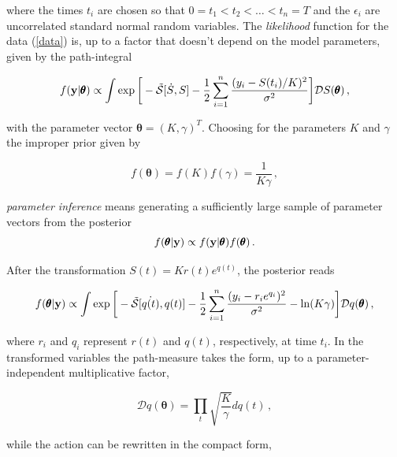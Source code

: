 \documentclass[11pt, a4paper]{article}
\newcommand{\vc}[1]{{\bf #1 }}
\newcommand{\bt}{\pmb\theta}
\begin{document}
where the times $t_i$ are chosen so that $0=t_1<t_2<\dots < t_n=T$ and the $\epsilon_i$ are uncorrelated standard normal random variables.
The {\em likelihood} function for the data (\ref{data}) is, up to a factor that doesn't depend on the model parameters, given by the path-integral

\begin{equation}\label{likelihood}
  f(\vc y | \bt)
  \propto
  \int
  \exp\bigg[
    -{\tilde{\mathcal S}}[\dot{S},S]
    -\frac{1}{2}
    \sum_{i=1}^n
    \frac
    {(y_i-S(t_i)/K)^2}
    {\sigma^2}
  \bigg]
  {\mathcal D} S(\bt)\,,
\end{equation}

with the parameter vector $\bt=(K,\gamma)^T$. Choosing for the parameters $K$ and $\gamma$ the improper prior given by

\begin{equation}\label{prior}
  f(\bt)
  =  f(K) f(\gamma) = \frac{1}{K \gamma} \,,
\end{equation}

{\em parameter inference} means generating a sufficiently large sample of parameter vectors from the posterior
\begin{equation}\label{posterior}
  f(\bt|\vc y)\propto f(\vc y|\bt)f(\bt)\,.
\end{equation}

After the transformation $S(t) = K r(t) e^{q(t)}$, the posterior reads

\begin{equation}\label{posterior_pathint}
  f(\bt | \vc y)
  \propto
  \int
  \exp\bigg[
    -{\tilde{\mathcal S}}[\dot{q(t)},q(t)]
    -\frac{1}{2}
    \sum_{i=1}^n
    \frac
    {(y_i-r_ie^{q_i})^2}
    {\sigma^2}
    -\ln(K\gamma)
  \bigg]
  {\mathcal Dq}({\pmb\theta})
  \,,
\end{equation}


where $r_i$ and $q_i$ represent $r(t)$ and $q(t)$, respectively, at time $t_i$. In the transformed variables the path-measure takes the form, up to a parameter-independent multiplicative factor,

\begin{equation}\label{pathmeasure_q}
{\mathcal Dq} (\bt)
=
\prod_{t}
\sqrt{\frac{K}{\gamma}} dq(t)\,,
\end{equation}

while the action can be rewritten in the compact form,
\end{document}
